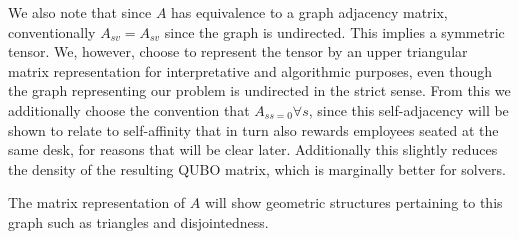 \documentclass[10pt]{article}
\theoremstyle{definition}
\theoremstyle{plain}
\theoremstyle{remark}
\begin{document}
	We also note that since $A$ has equivalence to a graph adjacency matrix, conventionally $A_{sv} = A_{sv}$ since the graph is undirected. This implies a symmetric tensor. We, however, choose to represent the tensor by an upper triangular matrix representation for interpretative and algorithmic purposes, even though the graph representing our problem is undirected in the strict sense. From this we additionally choose the convention that $A_{ss = 0} \forall s$, since this self-adjacency will be shown to relate to self-affinity that in turn also rewards employees seated at the same desk, for reasons that will be clear later. Additionally this slightly reduces the density of the resulting QUBO matrix, which is marginally better for solvers.
	
	The matrix representation of $A$ will show geometric structures pertaining to this graph such as triangles and disjointedness.
	
\end{document}
